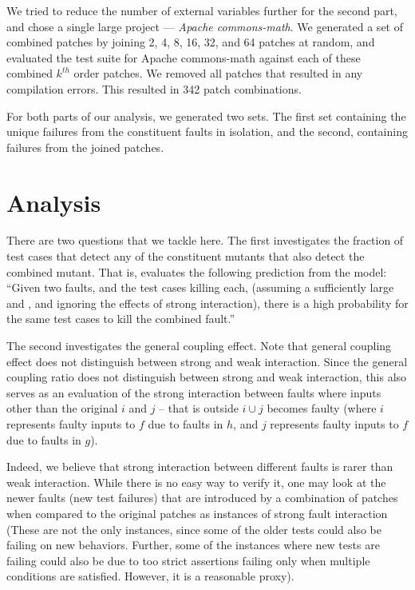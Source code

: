 \documentclass[preprint,nonatbib]{sigplanconf}\usepackage[]{graphicx}\usepackage[]{color}
\begin{document}
We tried to reduce the number of external variables further for the second
part, and chose a single large project --- \emph{Apache commons-math}.
We generated a set of combined patches by joining 2, 4, 8, 16, 32, and 64
patches at random, and evaluated the test suite for Apache commons-math against
each of these combined $k^{th}$ order patches. We removed all patches that
resulted in any compilation errors. This resulted in
342 patch combinations.

For both parts of our analysis, we generated two sets. The first set containing the unique
failures from the constituent faults in isolation, and the second, containing
failures from the joined patches.



\section{Analysis}
\label{sec:analysis}
There are two questions that we tackle here. The first investigates the
fraction of test cases that detect any of the constituent mutants that
also detect the combined mutant. That is, evaluates the following prediction
from the model:
``Given two faults, and the test cases killing each, (assuming a sufficiently
large \finput and \foutput, and ignoring the effects of strong interaction),
there is a high probability for the same test cases to kill the combined
fault.''

The second investigates the general coupling effect. Note that general coupling
effect does not distinguish between strong and weak interaction.
Since the general coupling ratio does not distinguish between strong and weak
interaction, this also serves as an evaluation of the strong interaction
between faults where inputs other than the original $i$ and $j$ -- that is
outside $i \cup j$ becomes faulty (where $i$ represents faulty inputs to $f$
due to faults in $h$, and $j$ represents faulty inputs to $f$ due to faults in $g$).

Indeed, we believe that strong interaction between different faults is
rarer than weak interaction. While there is no easy way to verify it, one may look
at the newer faults (new test failures) that are introduced by a combination of patches
when compared to the original patches as instances of strong fault interaction
(These are not the only instances, since some of the older tests could also
be failing on new behaviors. Further, some of the instances where new tests are
failing could also be due to too strict assertions failing only when multiple
conditions are satisfied. However, it is a reasonable proxy).
\end{document}
